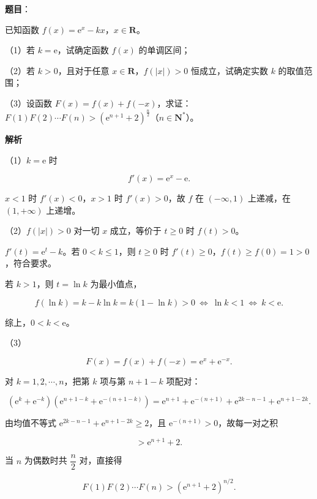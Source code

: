 \begin{answer}

\textbf{题目}：

已知函数 $f(x)=\mathrm e^x-kx$，$x\in\mathbf R$。

（1）若 $k=\mathrm e$，试确定函数 $f(x)$ 的单调区间；

（2）若 $k>0$，且对于任意 $x\in\mathbf R$，$f(|x|)>0$ 恒成立，试确定实数 $k$ 的取值范围；

（3）设函数 $F(x)=f(x)+f(-x)$，求证：$F(1)F(2)\cdots F(n)>(\mathrm e^{n+1}+2)^{\frac n2}$（$n\in\mathbf N^*$）。

\textbf{解析}

（1）$k=\mathrm e$ 时

\nopagebreak[4]
\[f'(x)=\mathrm e^x-\mathrm e.\]

$x<1$ 时 $f'(x)<0$，$x>1$ 时 $f'(x)>0$，故 $f$ 在 $(-\infty,1)$ 上递减，在 $(1,+\infty)$ 上递增。

（2）$f(|x|)>0$ 对一切 $x$ 成立，等价于 $t\geqslant0$ 时 $f(t)>0$。

$f'(t)=\mathrm e^t-k$。若 $0<k\leqslant1$，则 $t\geqslant0$ 时 $f'(t)\geqslant0$，$f(t)\geqslant f(0)=1>0$，符合要求。

若 $k>1$，则 $t=\ln k$ 为最小值点，

\nopagebreak[4]
\[f(\ln k)=k-k\ln k=k(1-\ln k)>0\ \Longleftrightarrow\ \ln k<1\ \Longleftrightarrow\ k<\mathrm e.\]

综上，$0<k<\mathrm e$。

（3）

\nopagebreak[4]
\[F(x)=f(x)+f(-x)=\mathrm e^x+\mathrm e^{-x}.\]

对 $k=1,2,\cdots,n$，把第 $k$ 项与第 $n+1-k$ 项配对：

\nopagebreak[4]
\[\left(\mathrm e^k+\mathrm e^{-k}\right)\left(\mathrm e^{n+1-k}+\mathrm e^{-(n+1-k)}\right)
=\mathrm e^{n+1}+\mathrm e^{-(n+1)}+\mathrm e^{2k-n-1}+\mathrm e^{n+1-2k}.\]

由均值不等式 $\mathrm e^{2k-n-1}+\mathrm e^{n+1-2k}\geqslant2$，且 $\mathrm e^{-(n+1)}>0$，故每一对之积

\nopagebreak[4]
\[> \mathrm e^{n+1}+2.\]

当 $n$ 为偶数时共 $\dfrac n2$ 对，直接得

\nopagebreak[4]
\[F(1)F(2)\cdots F(n)>\left(\mathrm e^{n+1}+2\right)^{n/2}.\]


\end{answer}
